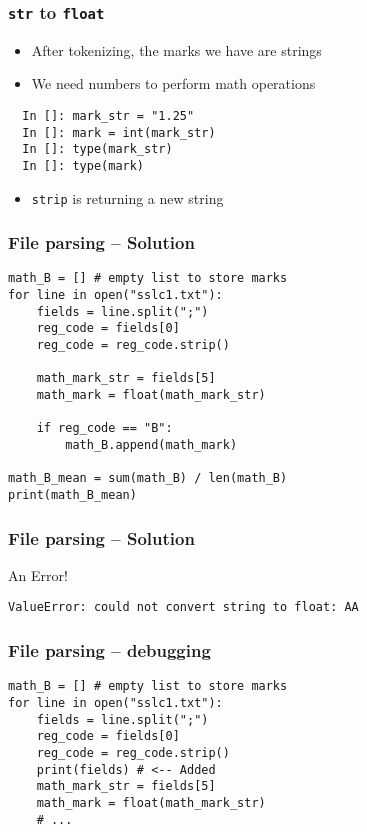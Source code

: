 \documentclass[14pt,compress]{beamer}
\begin{document}
\begin{frame}[fragile]
  \frametitle{\texttt{str} to \texttt{float}}
  \begin{itemize}
  \item After tokenizing, the marks we have are strings
  \item We need numbers to perform math operations
  \end{itemize}
  \begin{lstlisting}
  In []: mark_str = "1.25"
  In []: mark = int(mark_str)
  In []: type(mark_str)
  In []: type(mark)
  \end{lstlisting}
  \begin{itemize}
  \item \texttt{strip} is returning a new string
  \end{itemize}
\end{frame}

\begin{frame}
  \frametitle{File parsing -- Solution}
  \begin{lstlisting}
math_B = [] # empty list to store marks
for line in open("sslc1.txt"):
    fields = line.split(";")
    reg_code = fields[0]
    reg_code = reg_code.strip()

    math_mark_str = fields[5]
    math_mark = float(math_mark_str)

    if reg_code == "B":
        math_B.append(math_mark)

math_B_mean = sum(math_B) / len(math_B)
print(math_B_mean)
  \end{lstlisting}
\end{frame}

\begin{frame}
  \frametitle{File parsing -- Solution}
  An Error!
  \small
  \begin{lstlisting}
ValueError: could not convert string to float: AA
  \end{lstlisting}
\end{frame}

\begin{frame}
  \frametitle{File parsing -- debugging}
  \begin{lstlisting}
math_B = [] # empty list to store marks
for line in open("sslc1.txt"):
    fields = line.split(";")
    reg_code = fields[0]
    reg_code = reg_code.strip()
    print(fields) # <-- Added
    math_mark_str = fields[5]
    math_mark = float(math_mark_str)
    # ...
  \end{lstlisting}
\end{frame}
\end{document}
